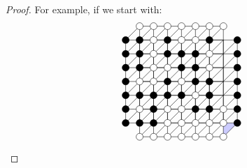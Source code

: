 \begin{proof}
For example, if we start with:
\[
\begin{tikzpicture}[scale=.5]
\fill[blue!20] (6,-1) -- (7,0) -- (6,0) -- cycle;
\draw (-1,0) grid (7,6);
\draw (0,-1) grid (6,7);
\foreach \i in {-1,...,6}
{
	\foreach \j in {0,...,5}
	{
		\draw (\i,\j) -- ({1+\i},{1+\j});
	}
}
\foreach \i in {0,...,6}
{
\draw ({\i-1},6) -- (\i,7);
\draw (\i,-1) -- ({\i+1},0);
}
\foreach \i in {0,...,6}
{
	\draw[black,fill=white] (\i,-1) circle (.25cm);
	\draw[black,fill=white] (\i,7) circle (.25cm);
	\draw[black,fill=black] (-1,\i) circle (.25cm);
	\draw[black,fill=black] (7,\i) circle (.25cm);
}
\draw[black,fill=black] (0,0) circle (.25cm);
\draw[black,fill=white] (0,1) circle (.25cm);
\draw[black,fill=black] (0,2) circle (.25cm);
\draw[black,fill=white] (0,3) circle (.25cm);
\draw[black,fill=black] (0,4) circle (.25cm);
\draw[black,fill=black] (0,5) circle (.25cm);
\draw[black,fill=black] (0,6) circle (.25cm);
\draw[black,fill=black] (1,0) circle (.25cm);
\draw[black,fill=black] (1,1) circle (.25cm);
\draw[black,fill=black] (1,2) circle (.25cm);
\draw[black,fill=white] (1,3) circle (.25cm);
\draw[black,fill=white] (1,4) circle (.25cm);
\draw[black,fill=white] (1,5) circle (.25cm);
\draw[black,fill=white] (1,6) circle (.25cm);
\draw[black,fill=white] (2,0) circle (.25cm);
\draw[black,fill=white] (2,1) circle (.25cm);
\draw[black,fill=black] (2,2) circle (.25cm);
\draw[black,fill=black] (2,3) circle (.25cm);
\draw[black,fill=white] (2,4) circle (.25cm);
\draw[black,fill=black] (2,5) circle (.25cm);
\draw[black,fill=black] (2,6) circle (.25cm);
\draw[black,fill=white] (3,0) circle (.25cm);
\draw[black,fill=white] (3,1) circle (.25cm);
\draw[black,fill=black] (3,2) circle (.25cm);
\draw[black,fill=white] (3,3) circle (.25cm);
\draw[black,fill=black] (3,4) circle (.25cm);
\draw[black,fill=black] (3,5) circle (.25cm);
\draw[black,fill=white] (3,6) circle (.25cm);
\draw[black,fill=white] (4,0) circle (.25cm);
\draw[black,fill=black] (4,1) circle (.25cm);
\draw[black,fill=white] (4,2) circle (.25cm);
\draw[black,fill=black] (4,3) circle (.25cm);
\draw[black,fill=black] (4,4) circle (.25cm);
\draw[black,fill=black] (4,5) circle (.25cm);
\draw[black,fill=white] (4,6) circle (.25cm);
\draw[black,fill=white] (5,0) circle (.25cm);
\draw[black,fill=black] (5,1) circle (.25cm);
\draw[black,fill=black] (5,2) circle (.25cm);
\draw[black,fill=black] (5,3) circle (.25cm);
\draw[black,fill=white] (5,4) circle (.25cm);
\draw[black,fill=white] (5,5) circle (.25cm);
\draw[black,fill=black] (5,6) circle (.25cm);
\draw[black,fill=white] (6,0) circle (.25cm);
\draw[black,fill=white] (6,1) circle (.25cm);

\end{tikzpicture}\]
\end{proof}
